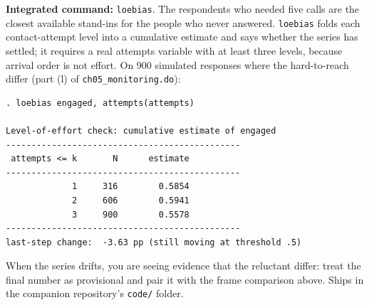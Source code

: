 \documentclass[
    a4paper,
    fontsize=10pt,
    twoside=true,
    numbers=noenddot,
]{kaobook}
\begin{document}
\begin{kaobox}[frametitle=Package Integration: \texttt{loebias}]
\textbf{Integrated command:} \texttt{loebias}. The respondents who needed five calls are the closest available stand-ins for the people who never answered. \texttt{loebias} folds each contact-attempt level into a cumulative estimate and says whether the series has settled; it requires a real attempts variable with at least three levels, because arrival order is not effort. On 900 simulated responses where the hard-to-reach differ (part (l) of \texttt{ch05\_monitoring.do}):
\par
{\footnotesize
\begin{verbatim}
. loebias engaged, attempts(attempts)

Level-of-effort check: cumulative estimate of engaged
----------------------------------------------
 attempts <= k       N      estimate
----------------------------------------------
             1     316        0.5854
             2     606        0.5941
             3     900        0.5578
----------------------------------------------
last-step change:  -3.63 pp (still moving at threshold .5)
\end{verbatim}
}
When the series drifts, you are seeing evidence that the reluctant differ: treat the final number as provisional and pair it with the frame comparison above. Ships in the companion repository's \texttt{code/} folder.
\end{kaobox}
\end{document}
